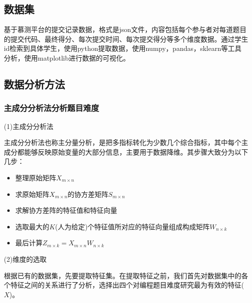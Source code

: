 \documentclass[UTF8]{ctexart}
\begin{document}
	\subsection{数据集}
	基于慕测平台的提交记录数据，格式是json文件，内容包括每个参与者对每道题目的提交代码、最终得分、每次提交时间、每次提交得分等多个维度数据。通过学生id检索到具体学生，使用python提取数据，使用numpy，pandas，sklearn等工具分析，使用matplotlib进行数据的可视化。	
	
	\subsection{数据分析方法}
	
	\subsubsection{主成分分析法分析题目难度}
	\par (1)主成分分析法
	\par 主成分分析法也称主分量分析，是把多指标转化为少数几个综合指标，其中每个主成分都能够反映原始变量的大部分信息，主要用于数据降维。其步骤大致分为以下几步：
	\begin{itemize}
		\item 整理原始矩阵$X_{m \times n}$
		\item 求原始矩阵$X_{m \times n}$的协方差矩阵$S_{m \times n}$
		\item 求解协方差阵的特征值和特征向量
		\item 选取最大的$K$(人为给定)个特征值所对应的特征向量组成构成矩阵$W_{n \times k}$
		\item 最后计算$Z_{m \times k}=X_{m \times n}W_{n \times k}$
	\end{itemize}
	\par (2)维度的选取
	\par 根据已有的数据集，先要提取特征集。在提取特征之前，我们首先对数据集中的各个特征之间的关系进行了分析，选择出四个对编程题目难度研究最为有效的特征($X$)。
	\par
\end{document}
